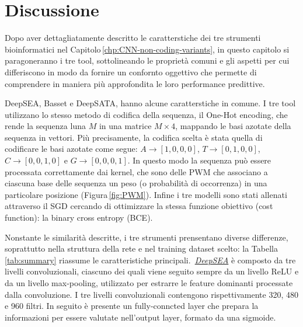 
\chapter{Discussione}\label{chp:discussion}


Dopo aver dettagliatamente descritto le caratterstiche dei tre strumenti bioinformatici nel Capitolo\,\ref{chp:CNN-non-coding-variants}, in questo capitolo si paragoneranno i tre tool, sottolineando le proprietà comuni e gli aspetti per cui differiscono in modo da fornire un confornto oggettivo che permette di comprendere in maniera più approfondita le loro performance predittive.

DeepSEA, Basset e DeepSATA, hanno alcune caratterstiche in comune. I tre tool utilizzano lo stesso metodo di codifica della sequenza, il One-Hot encoding, che rende la sequenza luna $M$ in una matrice $M\times 4$, mappando le basi azotate della sequenza in vettori. Più precisamente, la codifica scelta è stata quella di codificare le basi azotate come segue: $A \to \left[1, 0, 0, 0\right]$, $T \to \left[0, 1, 0, 0\right]$, $C \to \left[0, 0, 1, 0\right]$ e $G \to \left[0, 0, 0, 1\right]$. In questo modo la sequenza può essere processata correttamente dai kernel, che sono delle \acs{PWM} che associano a ciascuna base delle sequenza un peso (o probabilità di occorrenza) in una particolare posizione (Figura\,\ref{fig:PWM}). Infine i tre modelli sono stati allenati attraverso il \acs{SGD} cercando di ottimizzare la stessa funzione obiettivo (cost function): la binary cross entropy (\acs{BCE}).

Nonstante le similarità descritte, i tre strumenti prensentano diverse differenze, soprattutto nella struttura della rete e nel training dataset scelto: la Tabella\,\ref{tab:summary} riassume le caratteristiche principali. \,\hyperref[sec:DeepSEA]{\textsl{DeepSEA}} è composto da tre livelli convoluzionali, ciascuno dei quali viene seguito sempre da un livello \acs{ReLU} e da un livello max-pooling, utilizzato per estrarre le feature dominanti processate dalla convoluzione. I tre livelli convoluzionali contengono rispettivamente 320, 480 e 960 filtri. In seguito è presente un fully-conncted layer che prepara la informazioni per essere valutate nell'output layer, formato da una sigmoide.

